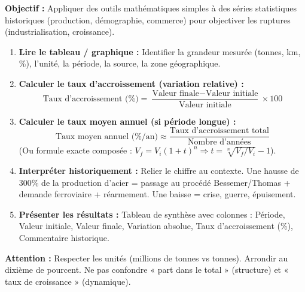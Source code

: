 \documentclass[11pt]{article}
\begin{document}
\begin{methode}
\textbf{Objectif :} Appliquer des outils mathématiques simples à des séries statistiques historiques (production, démographie, commerce) pour objectiver les ruptures (industrialisation, croissance).
\begin{enumerate}
    \item \textbf{Lire le tableau / graphique :} Identifier la grandeur mesurée (tonnes, km, \%), l'unité, la période, la source, la zone géographique.
    \item \textbf{Calculer le taux d'accroissement (variation relative) :}
    \[ \text{Taux d'accroissement (\%)} = \frac{\text{Valeur finale} - \text{Valeur initiale}}{\text{Valeur initiale}} \times 100 \]
    \item \textbf{Calculer le taux moyen annuel (si période longue) :}
    \[ \text{Taux moyen annuel (\%/an)} \approx \frac{\text{Taux d'accroissement total}}{\text{Nombre d'années}} \]
    (Ou formule exacte composée : $V_f = V_i (1+t)^n \Rightarrow t = \sqrt[n]{V_f/V_i} - 1$).
    \item \textbf{Interpréter historiquement :} Relier le chiffre au contexte. Une hausse de 300\% de la production d'acier = passage au procédé Bessemer/Thomas + demande ferroviaire + réarmement. Une baisse = crise, guerre, épuisement.
    \item \textbf{Présenter les résultats :} Tableau de synthèse avec colonnes : Période, Valeur initiale, Valeur finale, Variation absolue, Taux d'accroissement (\%), Commentaire historique.
\end{enumerate}
\textbf{Attention :} Respecter les unités (millions de tonnes vs tonnes). Arrondir au dixième de pourcent. Ne pas confondre « part dans le total » (structure) et « taux de croissance » (dynamique).
\end{methode}
\end{document}
